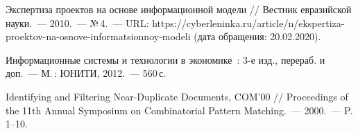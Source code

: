 \begin{thebibliography}{99}
\bibitem{} Экспертиза проектов на основе информационной модели // Вестник евразийской науки.~--- 2010.~--- №\,4.~--- URL: https://cyberleninka.ru/article/n/ekspertiza-proektov-na-osnove-informatsionnoy-modeli (дата обращения: 20.02.2020).


\bibitem{} Информационные системы и технологии в экономике~: 3-е изд., перераб. и доп.~--- М.\,: ЮНИТИ, 2012.~--- 560\,с.

\bibitem{} Identifying and Filtering Near-Duplicate Documents, COM’00 // Proceedings of the 11th Annual Symposium on Combinatorial Pattern Matching.~--- 2000.~--- P.\,1--10.
\end{thebibliography}
\thispagestyle{empty}
